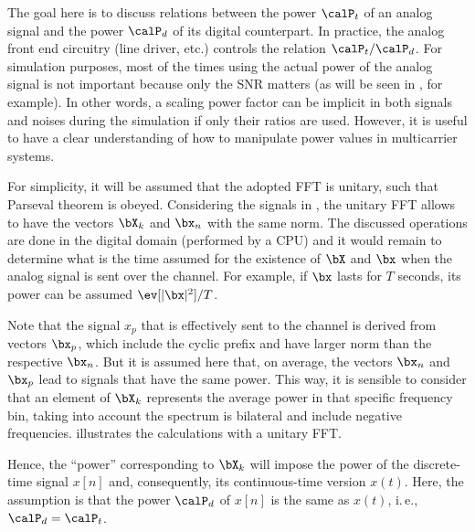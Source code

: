 The goal here is to discuss relations between the power $\calP_t$ of an analog signal and the power $\calP_d$ of its digital counterpart. In practice, the analog front end  circuitry (line driver, etc.) controls the relation $\calP_t / \calP_d$. For simulation purposes, most of the times using the actual power of the analog signal is not important because only the SNR matters (as will be seen in , for example). In other words, a scaling power factor can be implicit in both signals and noises during the simulation if only their ratios are used. However, it is useful to have a clear understanding of how to manipulate power values in multicarrier systems.

For simplicity, it will be assumed that the adopted FFT is unitary, such that Parseval theorem is obeyed. Considering the signals in , the unitary FFT allows to have the vectors $\bX_k$ and $\bx_n$ with the same norm.
The discussed operations are done in the digital domain (performed by a CPU) and it would remain to determine what is the time assumed for the existence of $\bX$ and $\bx$ when the analog signal is sent over the channel. For example, if $\bx$ lasts for $T$ seconds, its power can be assumed $\ev [ |\bx|^2]/T$. 

Note that the signal $x_p$ that is effectively sent to the channel is derived from vectors $\bx_p$, which include the cyclic prefix and have larger norm than the respective $\bx_n$. But it is assumed here that, on average, the vectors $\bx_n$ and $\bx_p$ lead to signals that have the same power. This way, it is sensible to consider that an element of $\bX_k$ represents the average power in that specific frequency bin, taking into account the spectrum is bilateral and include negative frequencies. 
 illustrates the calculations with a unitary FFT.

Hence, the ``power'' corresponding to $\bX_k$ will impose the power of the discrete-time signal $x[n]$ and, consequently, its continuous-time version $x(t)$. Here, the assumption is that the power $\calP_d$ of $x[n]$ is the same as $x(t)$, i.\,e., $\calP_d=\calP_t$.

